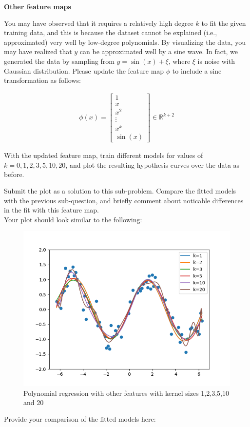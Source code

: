 \item {} {\bf Other feature maps}

You may have observed that it requires a relatively high degree $k$ to fit the given training data, and this is because the dataset cannot be explained (i.e., approximated) very well by low-degree polynomials. By visualizing the data, you may have realized that $y$ can be approximated well by a sine wave. In fact, we generated the data by sampling from $y = \sin(x) + \xi$, where $\xi$ is noise with Gaussian distribution. Please update the feature map $\phi$ to include a sine transformation as follows:

\begin{align}
\phi(x) = \left[\begin{array}{c} 1\\ x \\ x^2\\ \vdots \\x^k \\ \sin(x) \end{array}\right]\in \mathbb{R}^{k+2} \label{eqn:feature-sine}
\end{align}

With the updated feature map, train different models for values of $k=0,1,2,3,5,10,20$, and plot the resulting hypothesis curves over the data as before.

Submit the plot as a solution to this sub-problem. Compare the fitted models with the previous sub-question, and briefly comment about noticable differences in the fit with this feature map.\\

Your plot should look similar to the following:
\begin{figure}[H]
  \centering
  \includegraphics[width=0.65\linewidth]{featuremaps/src/large-sine.png}
  \centering
\caption{Polynomial regression with other features with kernel sizes 1,2,3,5,10 and 20}
\end{figure}

Provide your comparison of the fitted models here:\\[50pt]